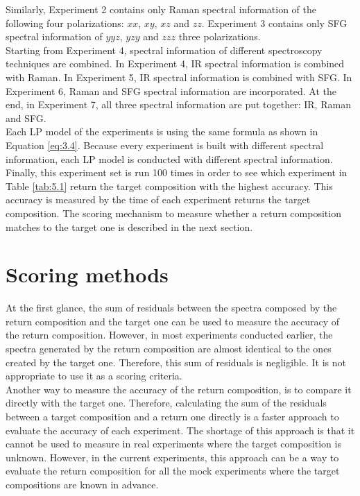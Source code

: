 Similarly, Experiment 2 contains only Raman spectral information of the following four polarizations: $xx$, $xy$, $xz$ and $zz$. Experiment 3 contains only SFG spectral information of $yyz$, $yzy$ and $zzz$ three polarizations. \\

Starting from Experiment 4, spectral information of different spectroscopy techniques are combined. In Experiment 4, IR spectral information is combined with Raman. In Experiment 5, IR spectral information is combined with SFG. In Experiment 6, Raman and SFG spectral information are incorporated. At the end, in Experiment 7, all three spectral information are put together: IR, Raman and SFG. \\

Each LP model of the experiments is using the same formula as shown in Equation \ref{eq:3.4}. Because every experiment is built with different spectral information, each LP model is conducted with different spectral information. \\

Finally, this experiment set is run 100 times in order to see which experiment in Table \ref{tab:5.1} return the target composition with the highest accuracy. This accuracy is measured by the time of each experiment returns the target composition. The scoring mechanism to measure whether a return composition matches to the target one is described in the next section. \\

\section{Scoring methods}

At the first glance, the sum of residuals between the spectra composed by the return composition and the target one can be used to measure the accuracy of the return composition. However, in most experiments conducted earlier, the spectra generated by the return composition are almost identical to the ones created by the target one. Therefore, this sum of residuals is negligible. It is not appropriate to use it as a scoring criteria. \\

Another way to measure the accuracy of the return composition, is to compare it directly with the target one. Therefore, calculating the sum of the residuals between a target composition and a return one directly is a faster approach to evaluate the accuracy of each experiment. The shortage of this approach is that it cannot be used to measure in real experiments where the target composition is unknown. However, in the current experiments, this approach can be a way to evaluate the return composition for all the mock experiments where the target compositions are known in advance. \\

